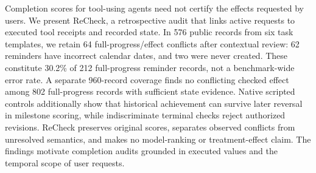 Completion scores for tool-using agents need not certify the effects requested by users. We present ReCheck, a retrospective audit that links active requests to executed tool receipts and recorded state. In 576 public records from six task templates, we retain 64 full-progress/effect conflicts after contextual review: 62 reminders have incorrect calendar dates, and two were never created. These constitute 30.2\% of 212 full-progress reminder records, not a benchmark-wide error rate. A separate 960-record coverage finds no conflicting checked effect among 802 full-progress records with sufficient state evidence. Native scripted controls additionally show that historical achievement can survive later reversal in milestone scoring, while indiscriminate terminal checks reject authorized revisions. ReCheck preserves original scores, separates observed conflicts from unresolved semantics, and makes no model-ranking or treatment-effect claim. The findings motivate completion audits grounded in executed values and the temporal scope of user requests.
